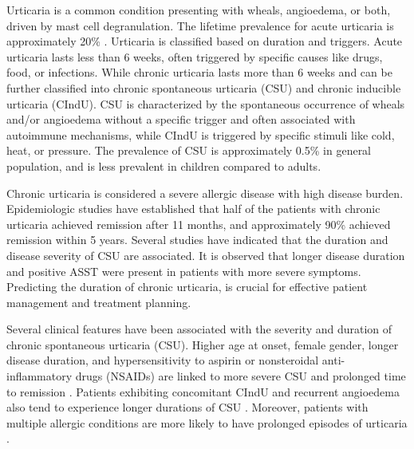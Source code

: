 \documentclass[final,3p,times,authoryear]{elsarticle}
\begin{document}
Urticaria is a common condition presenting with wheals, angioedema, or both, driven by mast cell degranulation\citep{Zuberbier2021The,RadonjicHoesli2018Urticaria,Ring2012Urticaria}. The lifetime prevalence for acute urticaria is approximately 20\% \citep{Zuberbier2021The}. Urticaria is classified based on duration and triggers. Acute urticaria lasts less than 6 weeks, often triggered by specific causes like drugs, food, or infections. While chronic urticaria lasts more than 6 weeks and can be further classified into chronic spontaneous urticaria (CSU) and chronic inducible urticaria (CIndU)\citep{Zuberbier2021The,Ring2012Urticaria}. CSU is characterized by the spontaneous occurrence of wheals and/or angioedema without a specific trigger and often associated with autoimmune mechanisms\citep{Schettini2023Urticaria}, while CIndU is triggered by specific stimuli like cold, heat, or pressure\citep{Pozderac2020Chronic}. The prevalence of CSU is approximately 0.5\% in general population, and is less prevalent in children compared to adults\citep{Balp2015The, Poddighe2019LETTER, Labbene2023Prevalence}. 

Chronic urticaria is considered a severe allergic disease with high disease burden\citep{Zuberbier2021The}. Epidemiologic studies have established that half of the patients with chronic urticaria achieved remission after 11 months, and approximately 90\% achieved remission within 5 years\citep{eun2019natural}. Several studies have indicated that the duration and disease severity of CSU are associated. It is observed that longer disease duration and positive ASST were present in patients with more severe symptoms\citep{SanchezBorges2017Factors}. Predicting the duration of chronic urticaria, is crucial for effective patient management and treatment planning. 

Several clinical features have been associated with the severity and duration of chronic spontaneous urticaria (CSU). Higher age at onset, female gender, longer disease duration, and hypersensitivity to aspirin or nonsteroidal anti-inflammatory drugs (NSAIDs) are linked to more severe CSU and prolonged time to remission \citep{SanchezBorges2017Factors,Rabelo-Filardi2013Parameters}. Patients exhibiting concomitant CIndU and recurrent angioedema also tend to experience longer durations of CSU \citep{SanchezBorges2017Factors, Curto-Barredo2018Clinical}. Moreover, patients with multiple allergic conditions are more likely to have prolonged episodes of urticaria \citep{Lin2011Predictive}.
\end{document}
